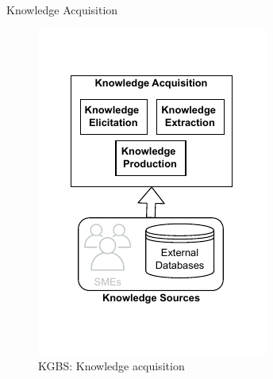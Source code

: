 \begin{frame}{Knowledge Acquisition}

    \begin{figure} [H]
        \begin{center}
            \includegraphics[scale=0.8]{images/KGBS-knowledge-acquisition.pdf} 
            \caption{KGBS: Knowledge acquisition} 
        \end{center}
    \end{figure}

\end{frame}




